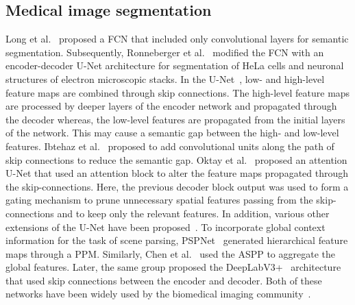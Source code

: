 \documentclass[journal,twoside,web]{IEEEtran}
\begin{document}
\subsection{Medical image segmentation}
Long et al.~\cite{long2015fully} proposed a \ac{FCN} that included only convolutional layers for semantic segmentation. Subsequently, Ronneberger et al.~\cite{ronneberger2015u} modified the \ac{FCN} with an encoder-decoder U-Net architecture for segmentation of HeLa cells and neuronal structures of electron microscopic stacks. In the U-Net~\cite{ronneberger2015u}, low- and high-level feature maps are combined through skip connections. The high-level feature maps are processed by deeper layers of the encoder network and propagated through the decoder whereas, the low-level features are propagated from the initial layers of the network. This may cause a semantic gap between the high- and low-level features. Ibtehaz et al.~\cite{ibtehaz2020multiresunet} proposed to add convolutional units along the path of skip connections to reduce the semantic gap. Oktay et al.~\cite{oktay2018attention} proposed an attention U-Net that used an attention block to alter the feature maps propagated through the skip-connections. Here, the previous decoder block output was used to form a gating mechanism to prune unnecessary spatial features passing from the skip-connections and to keep only the relevant features. In addition, various other extensions of the U-Net have been proposed~\cite{zhou2019unet++,jha2019resunet++,jha2020doubleu,zhou2018unet++,sun2020saunet}. To incorporate global context information for the task of scene parsing, PSPNet~\cite{zhao2017pyramid} generated hierarchical feature maps through a \ac{PPM}. Similarly, Chen et al.~\cite{chen2017deeplab} used the \ac{ASPP} to aggregate the global features. Later, the same group proposed the DeepLabV3+~\cite{chen2018encoder} architecture that used skip connections between the encoder and decoder. Both of these networks have been widely used by the biomedical imaging community~\cite{hassan2020,rad2019cell,guo2020polyp}.
\end{document}

